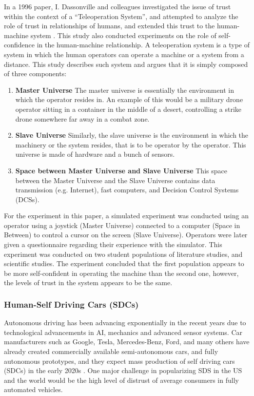 \documentclass[runningheads,a4paper]{llncs}
\begin{document}
In a 1996 paper, I. Dassonville and colleagues investigated the issue of trust within the context of a ``Teleoperation System'', and attempted to analyze the role of trust in relationships of humans, and extended this trust to the human-machine system \cite{dassonville1996trust}. This study also conducted experiments on the role of self-confidence in the human-machine relationship. A teleoperation system is a type of system in which the human operators can operate a machine or a system from a distance. This study describes such system and argues that it is simply composed of three components:
\begin{enumerate}
	\item \textbf{Master Universe}
	The master universe is essentially the environment in which the operator resides in. An example of this would be a military drone operator sitting in a container in the middle of a desert, controlling a strike drone somewhere far away in a combat zone. 
\item \textbf{Slave Universe}
Similarly, the slave universe is the environment in which the machinery or the system resides, that is to be operator by the operator. This universe is made of hardware and a bunch of sensors.
\item \textbf{Space between Master Universe and Slave Universe}
This space between the Master Universe and the Slave Universe contains data transmission (e.g. Internet), fast computers, and Decision Control Systems (DCSs).
\end{enumerate}

For the experiment in this paper, a simulated experiment was conducted using an operator using a joystick (Master Universe) connected to a computer (Space in Between) to control a cursor on the screen (Slave Universe). Operators were later given a questionnaire regarding their experience with the simulator. This experiment was conducted on two student populations of literature studies, and scientific studies. The experiment concluded that the first population appears to be more self-confident in operating the machine than the second one, however, the levels of trust in the system appears to be the same.

\subsubsection{Human-Self Driving Cars (SDCs)}
Autonomous driving has been advancing exponentially in the recent years due to technological advancements in AI, mechanics and advanced sensor systems. Car manufacturers such as Google, Tesla, Mercedes-Benz, Ford, and many others have already created commercially available semi-autonomous cars, and fully autonomous prototypes, and they expect mass production of self driving cars (SDCs) in the early 2020s \cite{driverlessFutureForcast}. One major challenge in popularizing SDS in the US and the world would be the high level of distrust of average consumers in fully automated vehicles.
\end{document}
